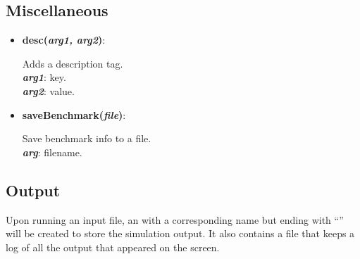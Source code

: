 \subsection{Miscellaneous}

\begin{itemize}

 \item {\textbf{desc(\textit{arg1, arg2})}:
				\flushright\parbox{0.9 \textwidth}{\vspace{-0.25cm} 
				Adds a description tag.\\
				\textbf{\textit{arg1}}: key.\\
				\textbf{\textit{arg2}}: value.
				}\flushleft}

 \item {\vspace{-0.4cm}\textbf{saveBenchmark(\textit{file})}:
				\flushright\parbox{0.9 \textwidth}{\vspace{-0.25cm} 
				Save benchmark info to a file.\\
				\textbf{\textit{arg}}: filename.
				}\flushleft}

\end{itemize}


\subsection{Output}


Upon running an input file, an  with a corresponding name but ending with ``'' will be created to store the simulation output. It also contains a file  that keeps a log of all the output that appeared on the screen.  



